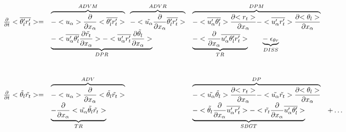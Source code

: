 \begin{displaymath}
\left.
\begin{array}{rllll}
\frac{\partial }{\partial t} <\overline{\theta_l'r_t'}> = & 
\overbrace{- <u_\alpha>\frac{\partial}{\partial x_\alpha} <\overline{\theta_l'r_t'}> }^{ADVM} \;\;
\overbrace{- <\tilde{u_\alpha}\frac{\partial}{\partial x_\alpha} \overline{\theta_l'r_t'} > }^{ADVR} &
\overbrace{- <\overline{u_\alpha'\theta_l'}> \frac{\partial {<r_t>}}{\partial x_\alpha}
- <\overline{u'_\alpha r_t'}> \frac{\partial {<\theta_l>}}{\partial x_\alpha}}^{DPM} \\
\vspace*{1.0cm}
& \underbrace{- <\overline{u'_\alpha \theta_l'} \frac{\partial {\tilde{r_t}}}{\partial x_\alpha}>
- <\overline{u'_\alpha r_t'} \frac{\partial {\tilde{\theta_l}}}{\partial x_\alpha}>}_{DPR} 
 & \underbrace{- <\frac{\partial}{\partial x_\alpha} \overline{u'_\alpha \theta_l'r_t'}>}_{TR} \;\;\;\;\;\;\;
 \underbrace{-\; \epsilon_{\theta r}}_{DISS}\\
 \frac{\partial }{\partial t} <\tilde{\theta_l}\tilde{r_t}> = & 
\overbrace{- <u_\alpha>\frac{\partial}{\partial x_\alpha} <\tilde{\theta_l}\tilde{r_t}> }^{ADV} &
\overbrace{- <\tilde{u_\alpha} \tilde{\theta_l}> \frac{\partial {<r_t>}}{\partial x_\alpha}
- <\tilde{u_\alpha} \tilde{r_t}> \frac{\partial {<\theta_l>}}{\partial x_\alpha}}^{DP} &\\
 & \underbrace{- \frac{\partial}{\partial x_\alpha} <\tilde{u_\alpha} \tilde{\theta_l}\tilde{r_t}>}_{TR} &
\underbrace{- <\tilde{\theta_l}\frac{\partial}{\partial x_\alpha}\overline{u'_\alpha r_t'}>
- <\tilde{r_t}\frac{\partial}{\partial x_\alpha}\overline{u'_\alpha \theta_l'}>}_{SBGT} & + \ldots
\end{array}
\right.
\end{displaymath}

